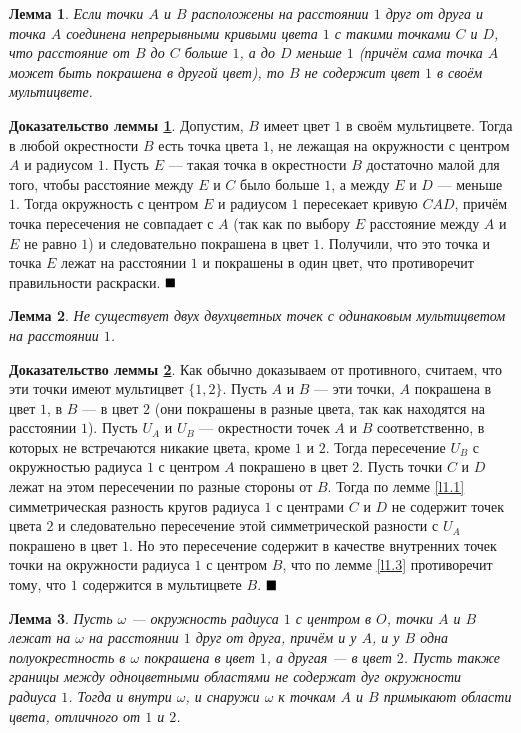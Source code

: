 \documentclass[12pt,a4paper]{article}
\newtheorem{lemma}{Лемма}
\renewcommand{\qed}{$\blacksquare \vspace{5mm}$}
\begin{document}
\begin{lemma} \label{l1.4}
	Если точки $A$ и $B$ расположены на расстоянии $1$ друг от друга и точка $A$ соединена непрерывными кривыми цвета $1$ с такими точками $C$ и $D$, что расстояние от $B$ до $C$ больше $1$, а до $D$ меньше $1$ (причём сама точка $A$ может быть покрашена в другой цвет), то $B$ не содержит цвет $1$ в своём мультицвете.
\end{lemma}

\textbf{Доказательство леммы \ref{l1.4}}. Допустим, $B$ имеет цвет $1$ в своём мультицвете. Тогда в любой окрестности $B$ есть точка цвета $1$, не лежащая на окружности с центром $A$ и радиусом $1$. Пусть $E$ --- такая точка в окрестности $B$ достаточно малой для того, чтобы расстояние между $E$ и $C$ было больше $1$, а между $E$ и $D$ --- меньше $1$. Тогда окружность с центром $E$ и радиусом $1$ пересекает кривую $CAD$, причём точка пересечения не совпадает с $A$ (так как по выбору $E$ расстояние между $A$ и $E$ не равно $1$) и следовательно покрашена в цвет $1$. Получили, что это точка и точка $E$ лежат на расстоянии $1$ и покрашены в один цвет, что противоречит правильности раскраски. \qed

\begin{lemma} \label{l1.5}
	Не существует двух двухцветных точек с одинаковым мультицветом на расстоянии $1$.
\end{lemma}

\textbf{Доказательство леммы \ref{l1.5}}. Как обычно доказываем от противного, считаем, что эти точки имеют мультицвет $\{1, 2\}$. Пусть $A$ и $B$ --- эти точки, $A$ покрашена в цвет $1$, в $B$ --- в цвет $2$ (они покрашены в разные цвета, так как находятся на расстоянии $1$). Пусть $U_A$ и $U_B$ --- окрестности точек $A$ и $B$ соответственно, в которых не встречаются никакие цвета, кроме $1$ и $2$. Тогда пересечение $U_B$ с окружностью радиуса $1$ с центром $A$ покрашено в цвет $2$. Пусть точки $C$ и $D$ лежат на этом пересечении по разные стороны от $B$. Тогда по лемме \ref{l1.1} симметрическая разность кругов радиуса $1$ с центрами $C$ и $D$ не содержит точек цвета $2$ и следовательно пересечение этой симметрической разности с $U_A$ покрашено в цвет $1$. Но это пересечение содержит в качестве внутренних точек точки на окружности радиуса $1$ с центром $B$, что по лемме \ref{l1.3} противоречит тому, что $1$ содержится в мультицвете $B$. \qed

\begin{lemma} \label{l1.6}
    Пусть $\omega$ --- окружность радиуса $1$ с центром в $O$, точки $A$ и $B$ лежат на $\omega$ на расстоянии $1$ друг от друга, причём и у $A$, и у $B$ одна полуокрестность в $\omega$ покрашена в цвет $1$, а другая --- в цвет $2$. Пусть также границы между одноцветными областями не содержат дуг окружности радиуса $1$. Тогда и внутри $\omega$, и снаружи $\omega$ к точкам $A$ и $B$ примыкают области цвета, отличного от $1$ и $2$.
\end{lemma}
\end{document}
